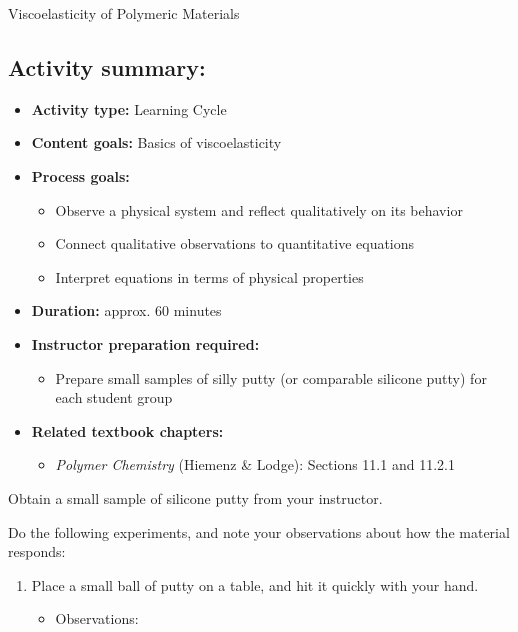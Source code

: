 \begin{activity}{Viscoelasticity of Polymeric Materials}
\begin{instructornotes}
	\subsection*{Activity summary:}
	\begin{itemize}
		\item \textbf{Activity type:} Learning Cycle
		\item \textbf{Content goals:} Basics of viscoelasticity
		\item \textbf{Process goals:} %
			\begin{itemize}
				\item Observe a physical system and reflect qualitatively on its behavior
				\item Connect qualitative observations to quantitative equations
				\item Interpret equations in terms of physical properties 
			\end{itemize}
		\item \textbf{Duration:} approx. 60 minutes
		\item \textbf{Instructor preparation required:} 
			\begin{itemize}
				\item Prepare small samples of silly putty (or comparable silicone putty) for each student group
			\end{itemize}
		\item \textbf{Related textbook chapters:}
			\begin{itemize}
				\item \emph{Polymer Chemistry} (Hiemenz \& Lodge): Sections 11.1 and 11.2.1
			\end{itemize}
	\end{itemize}

\end{instructornotes}


\begin{model}
\label{model:sillyputty}

	Obtain a small sample of silicone putty from your instructor.
	
	Do the following experiments, and note your observations about how the material responds:
	
	\begin{enumerate}
		\item Place a small ball of putty on a table, and hit it quickly with your hand.
			\begin{itemize}
				\item Observations:
				

\end{itemize}
\end{enumerate}
\end{model}
\end{activity}

